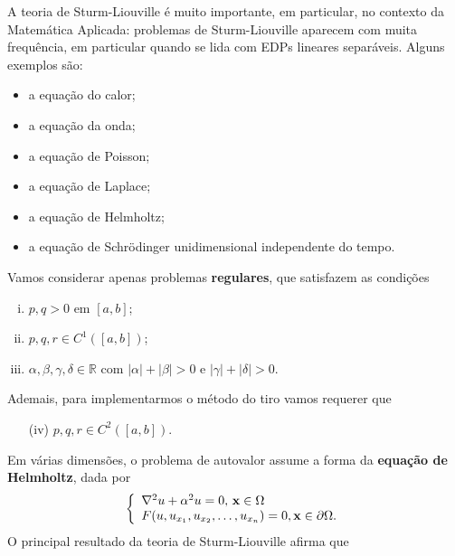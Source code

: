 \documentclass[twocolumn,showpacs,%
  nofootinbib,aps,superscriptaddress,%
  eqsecnum,prd,notitlepage,showkeys,10pt]{revtex4-1}
\newcommand{\R}{\mathbb{R}}
\begin{document}
A teoria de Sturm-Liouville é muito importante, em particular, no contexto
da Matemática Aplicada: problemas de Sturm-Liouville aparecem com muita
frequência, em particular quando se lida com EDPs lineares separáveis.
Alguns exemplos são:
%
\begin{itemize}
    \item a equação do calor;
    \item a equação da onda;
    \item a equação de Poisson;
    \item a equação de Laplace;
    \item a equação de Helmholtz;
    \item a equação de Schrödinger unidimensional independente do tempo.
\end{itemize}
%
Vamos considerar apenas problemas \textbf{regulares}, que satisfazem as condições
%
\begin{enumerate}[(i)]
    \item $p, q > 0$ em $[a,b]$;
    \item $p, q, r\in C^1([a,b])$;
    \item $\alpha, \beta, \gamma, \delta \in\R$ com $|\alpha| + |\beta| > 0$
    e $|\gamma| + |\delta| > 0$.
\end{enumerate}
%
Ademais, para implementarmos o método do tiro vamos requerer que
%
\begin{itemize}
    \item[(iv)] $p, q, r\in C^2([a,b])$.
\end{itemize}
%
Em várias dimensões, o problema de autovalor assume a forma da
\textbf{equação de Helmholtz}, dada por
%
\begin{equation}
\label{eq:helmholtz}
    \left\{
    \begin{array}{l}
        \laplacian u + \alpha^2u = 0, \, \mathbf{x}\in\Omega \\
        F(u, u_{x_1}, u_{x_2}, \dots, u_{x_n}) = 0, \mathbf{x}\in\partial\Omega.
    \end{array}
    \right.
\end{equation}
%
O principal resultado da teoria de Sturm-Liouville afirma que
%
\end{document}
